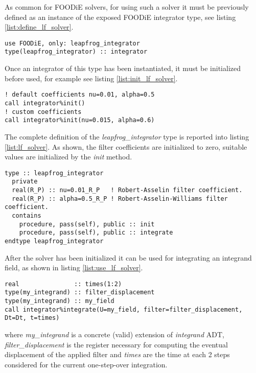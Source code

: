\documentclass[pdftex,preprint,3p,times,numbers]{elsarticle}
\begin{document}
As common for FOODiE solvers, for using such a solver it must be previously defined as an instance of the exposed FOODiE integrator type, see listing \ref{list:define_lf_solver}.

\begin{lstlisting}[firstnumber=1,style=code,caption={definition of an explicit Leapfrog integrator},label={list:define_lf_solver}]
use FOODiE, only: leapfrog_integrator
type(leapfrog_integrator) :: integrator
\end{lstlisting}

Once an integrator of this type has been instantiated, it must be initialized before used, for example see listing \ref{list:init_lf_solver}.

\begin{lstlisting}[firstnumber=1,style=code,caption={example of initialization of an explicit Leapfrog integrator},label={list:init_lf_solver}]
! default coefficients nu=0.01, alpha=0.5
call integrator%init()
! custom coefficients
call integrator%init(nu=0.015, alpha=0.6)
\end{lstlisting}

The complete definition of the \emph{leapfrog\_integrator} type is reported into listing \ref{list:lf_solver}. As shown, the filter coefficients are initialized to zero, suitable values are initialized by the \emph{init} method.

\begin{lstlisting}[firstnumber=1,style=code,caption={definition of \emph{leapfrog\_integrator} type},label={list:lf_solver}]
type :: leapfrog_integrator
  private
  real(R_P) :: nu=0.01_R_P   ! Robert-Asselin filter coefficient.
  real(R_P) :: alpha=0.5_R_P ! Robert-Asselin-Williams filter coefficient.
  contains
    procedure, pass(self), public :: init
    procedure, pass(self), public :: integrate
endtype leapfrog_integrator
\end{lstlisting}

After the solver has been initialized it can be used for integrating an integrand field, as shown in listing \ref{list:use_lf_solver}.

\begin{lstlisting}[firstnumber=1,style=code,caption={example of usage of a Leapfrog integrator},label={list:use_lf_solver}]
real               :: times(1:2)
type(my_integrand) :: filter_displacement
type(my_integrand) :: my_field
call integrator%integrate(U=my_field, filter=filter_displacement, Dt=Dt, t=times)
\end{lstlisting}
where \emph{my\_integrand} is a concrete (valid) extension of \emph{integrand} ADT, \emph{filter\_displacement} is the register necessary for computing the eventual displacement of the applied filter and \emph{times} are the time at each 2 steps considered for the current one-step-over integration.
\end{document}
